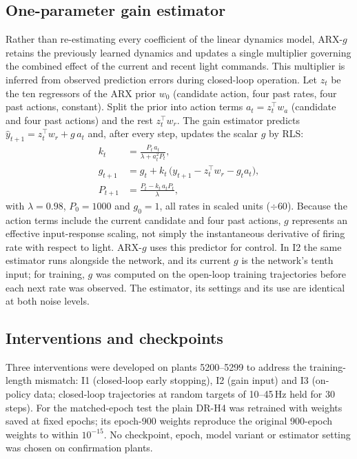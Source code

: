 \documentclass[11pt]{article}
\newcommand{\Hz}{\,Hz}
\begin{document}
\subsection{One-parameter gain estimator}\label{sec:gain}
Rather than re-estimating every coefficient of the linear dynamics model, ARX-$g$ retains the previously learned dynamics and updates a single multiplier governing the combined effect of the current and recent light commands. This multiplier is inferred from observed prediction errors during closed-loop operation. Let $z_t$ be the ten regressors of the ARX prior $w_0$ (candidate action, four past rates, four past actions, constant). Split the prior into action terms $a_t=z_t^\top w_a$ (candidate and four past actions) and the rest $z_t^\top w_r$. The gain estimator predicts $\hat y_{t+1}=z_t^\top w_r + g\,a_t$ and, after every step, updates the scalar $g$ by RLS:
\begin{align}
k_t &= \frac{P_t\,a_t}{\lambda + a_t^2 P_t},\nonumber\\
g_{t+1} &= g_t + k_t\,\big(y_{t+1} - z_t^\top w_r - g_t a_t\big),\\
P_{t+1} &= \frac{P_t - k_t\,a_t P_t}{\lambda},\nonumber
\end{align}
with $\lambda=0.98$, $P_0=1000$ and $g_0=1$, all rates in scaled units ($\div60$). Because the action terms include the current candidate and four past actions, $g$ represents an effective input-response scaling, not simply the instantaneous derivative of firing rate with respect to light. ARX-$g$ uses this predictor for control. In I2 the same estimator runs alongside the network, and its current $g$ is the network's tenth input; for training, $g$ was computed on the open-loop training trajectories before each next rate was observed. The estimator, its settings and its use are identical at both noise levels.

\subsection{Interventions and checkpoints}
Three interventions were developed on plants 5200--5299 to address the training-length mismatch: I1 (closed-loop early stopping), I2 (gain input) and I3 (on-policy data; closed-loop trajectories at random targets of 10--45\Hz{} held for 30 steps). For the matched-epoch test the plain DR-H4 was retrained with weights saved at fixed epochs; its epoch-900 weights reproduce the original 900-epoch weights to within $10^{-15}$. No checkpoint, epoch, model variant or estimator setting was chosen on confirmation plants.
\end{document}
